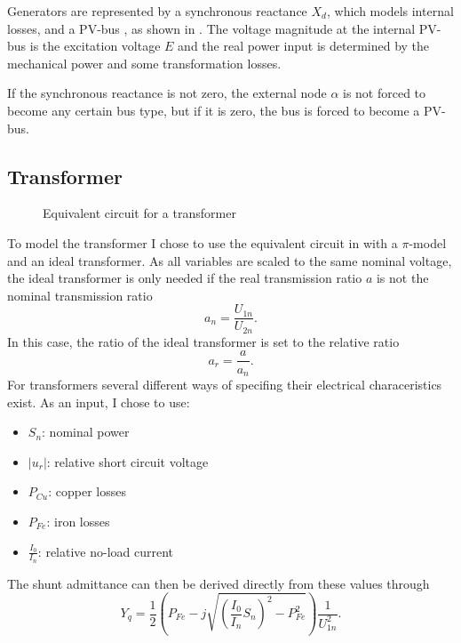 Generators are represented by a synchronous reactance $X_d$, which models internal losses, and a PV-bus \citep[p. 55]{powerSystemAnalysis}, as shown in . The voltage magnitude at the internal PV-bus is the excitation voltage $E$ and the real power input is determined by the mechanical power and some transformation losses. 

If the synchronous reactance is not zero, the external node $\alpha$ is not forced to become any certain bus type, but if it is zero, the bus is forced to become a PV-bus.

\subsection{Transformer}

\begin{figure}
	\centering
	
	\caption{Equivalent circuit for a transformer}
	\label{fig:transformer}
\end{figure}

To model the transformer I chose to use the equivalent circuit in  with a $\pi$-model and an ideal transformer. As all variables are scaled to the same nominal voltage, the ideal transformer is only needed if the real transmission ratio $a$ is not the nominal transmission ratio
\begin{equation}
	a_n = \frac{U_{1n}}{U_{2n}}.
\end{equation}
In this case, the ratio of the ideal transformer is set to the relative ratio
\begin{equation}
	a_r = \frac{a}{a_n}.
\end{equation}
For transformers several different ways of specifing their electrical characeristics exist. As an input, I chose to use:
\begin{itemize}
	\item $S_n$: nominal power
	\item $|u_r|$: relative short circuit voltage
	\item $P_{Cu}$: copper losses
	\item $P_{Fe}$: iron losses
	\item $\frac{I_0}{I_n}$: relative no-load current
\end{itemize}

The shunt admittance can then be derived directly from these values through
\begin{equation}
	Y_q = \frac{1}{2} \left( P_{Fe} - j \sqrt{\left( \frac{I_0}{I_n} S_n \right)^2 - P_{Fe}^2} \right) \frac{1}{U_{1n}^2}.
\end{equation}

